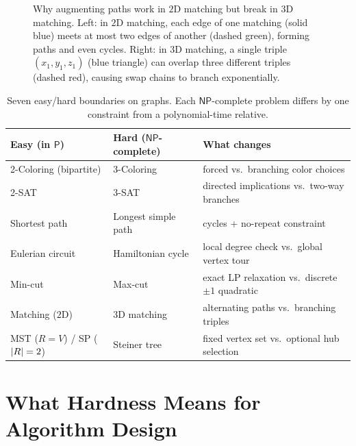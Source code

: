 \begin{figure}[htbp]
\caption{Why augmenting paths work in $2$D matching but break in $3$D matching. Left: in $2$D matching, each edge of one matching (solid blue) meets at most two edges of another (dashed green), forming paths and even cycles. Right: in $3$D matching, a single triple $(x_1,y_1,z_1)$ (blue triangle) can overlap three different triples (dashed red), causing swap chains to branch exponentially.}
\label{ch37:fig-2d-vs-3d-matching}
\end{figure}

\begin{table}[htbp]
\centering\small
\begin{tabular}{lll}
\toprule
\textbf{Easy (in $\mathsf{P}$)} & \textbf{Hard ($\mathsf{NP}$-complete)} & \textbf{What changes}\\
\midrule
2-Coloring (bipartite) & 3-Coloring & forced vs.\ branching color choices\\
2-SAT & 3-SAT & directed implications vs.\ two-way branches\\
Shortest path & Longest simple path & cycles + no-repeat constraint\\
Eulerian circuit & Hamiltonian cycle & local degree check vs.\ global vertex tour\\
Min-cut & Max-cut & exact LP relaxation vs.\ discrete $\pm 1$ quadratic\\
Matching ($2$D) & $3$D matching & alternating paths vs.\ branching triples\\
MST ($R=V$) / SP ($\lvert R\rvert=2$) & Steiner tree & fixed vertex set vs.\ optional hub selection\\
\bottomrule
\end{tabular}
\caption{Seven easy/hard boundaries on graphs. Each $\mathsf{NP}$-complete problem differs by one constraint from a polynomial-time relative.}
\label{ch37:tab-boundary}
\end{table}

\section{What Hardness Means for Algorithm Design}
\label{ch37:design}

